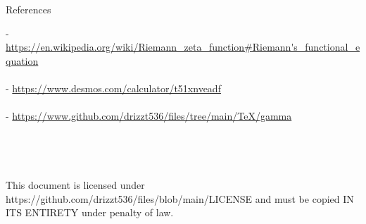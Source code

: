 \documentclass[12pt]{article}
\begin{document}
\pagebreak\begin{section}{References}

	\noindent- \url{https://en.wikipedia.org/wiki/Riemann\_zeta\_function\#Riemann's\_functional\_equation}\\
	\indent{}\\

	\noindent- \url{https://www.desmos.com/calculator/t51xnveadf}\\
	\indent{}\\

	\noindent- \url{https://www.github.com/drizzt536/files/tree/main/TeX/gamma}\\
	\indent{}
	\\
	\\
	\\
	\\
	This document is licensed under https://github.com/drizzt536/files/blob/main/LICENSE
	and must be copied IN ITS ENTIRETY under penalty of law.
\end{section}
\end{document}
